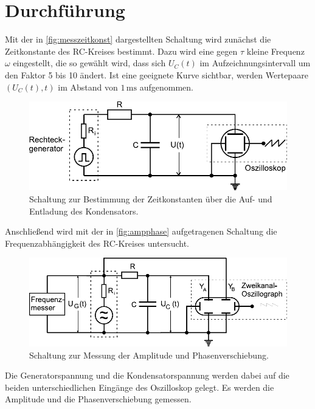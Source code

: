 \section{Durchführung}
\label{sec:Durchführung}

Mit der in \autoref{fig:messzeitkonst} dargestellten Schaltung wird zunächst die Zeitkonstante des RC-Kreises bestimmt.
Dazu wird eine gegen $τ$ kleine Frequenz $ω$ eingestellt, die so gewählt wird, dass sich $U_C(t)$ im Aufzeichnungsintervall um den Faktor 5 bis 10 ändert.
Ist eine geeignete Kurve sichtbar, werden Wertepaare $(U_C(t),t)$ im Abstand von $1 \,\unit{\milli\second}$ aufgenommen. \\

\begin{figure}
    \centering
    \includegraphics{figures/Messung a) Schaltung.pdf}
    \caption{Schaltung zur Bestimmung der Zeitkonstanten über die Auf- und Entladung des Kondensators\cite{ap08}.}
    \label{fig:messzeitkonst}
\end{figure}

Anschließend wird mit der in \autoref{fig:ampphase} aufgetragenen Schaltung die Frequenzabhängigkeit des RC-Kreises untersucht.

\begin{figure}
    \centering
    \includegraphics{figures/Messung b )& c).pdf}
    \caption{Schaltung zur Messung der Amplitude und Phasenverschiebung\cite{ap08}.}
    \label{fig:ampphase}
\end{figure}
Die Generatorspannung und die Kondensatorspannung werden dabei auf die beiden unterschiedlichen Eingänge des Oszilloskop gelegt.
Es werden die Amplitude und die Phasenverschiebung gemessen.

